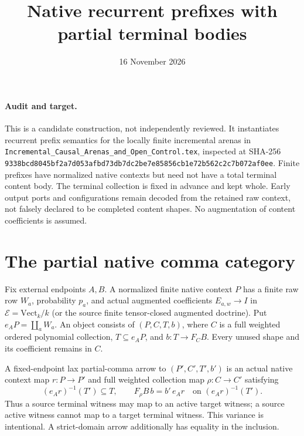 \documentclass{article}
\title{Native recurrent prefixes with partial terminal bodies}
\date{16 November 2026}
\begin{document}
\maketitle
\paragraph{Audit and target.}
This is a candidate construction, not independently reviewed. It instantiates
recurrent prefix semantics for the locally finite incremental arenas in
\texttt{Incremental\_Causal\_Arenas\_and\_Open\_Control.tex}, inspected at
SHA-256 \texttt{9338bcd8045bf2a7d053afbd73db7dc2be7e85856cb1e72b562c2c7b072af0ee}.
Finite prefixes have normalized native contexts but need not have a total
terminal content body. The terminal collection is fixed in advance and kept
whole. Early output ports and configurations remain decoded from the retained
raw context, not falsely declared to be completed content shapes. No
augmentation of content coefficients is assumed.

\section{The partial native comma category}
Fix external endpoints $A,B$. A normalized finite native context $P$ has a
finite raw row $W_a$, probability $p_a$, and actual augmented coefficients
$E_{a,w}\to I$ in $\mathcal E=\mathrm{Vect}_k/k$ (or the source finite
tensor-closed augmented doctrine). Put $e_AP=\coprod_aW_a$.
An object consists of $(P,C,T,b)$, where $C$ is a full weighted ordered
polynomial collection, $T\subseteq e_AP$, and $b:T\to F_CB$.
Every unused shape and its coefficient remains in $C$.

A fixed-endpoint lax partial-comma arrow to $(P',C',T',b')$ is an actual
native context map $r:P\to P'$ and full weighted collection map
$\rho:C\to C'$ satisfying
\[
 (e_Ar)^{-1}(T')\subseteq T,\qquad
 F_\rho B\,b=b'\,e_Ar\quad\text{on }(e_Ar)^{-1}(T'). \tag{L}
\]
Thus a source terminal witness may map to an active target witness; a source
active witness cannot map to a target terminal witness. This variance is
intentional. A strict-domain arrow additionally has equality in the inclusion.
\end{document}
